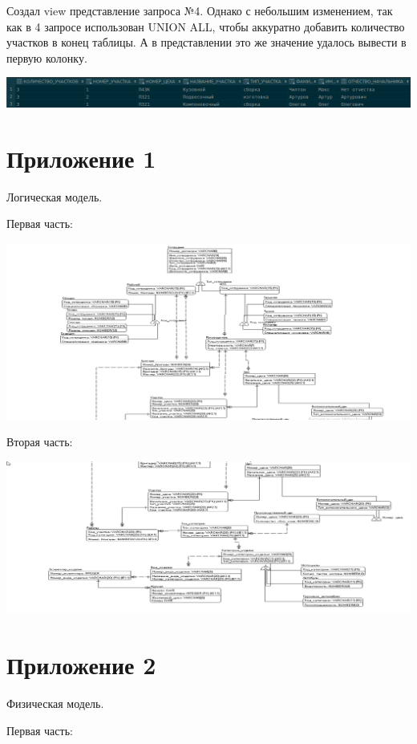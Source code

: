 Создал view представление запроса №4.
Однако с небольшим изменением, так как в 4 запросе использован UNION ALL, чтобы аккуратно добавить количество участков в конец таблицы.
А в представлении это же значение удалось вывести в первую колонку.

\includegraphics[width=16cm]{./screenshots/view/result.png}

\section{Приложение 1}

    Логическая модель.

    Первая часть:

    \includegraphics[width=14cm]{./screenshots/model/logical_top.png}

    Вторая часть:

    \includegraphics[width=14cm]{./screenshots/model/logical_bottom.png}

\section{Приложение 2}

    Физическая модель.

    Первая часть:

